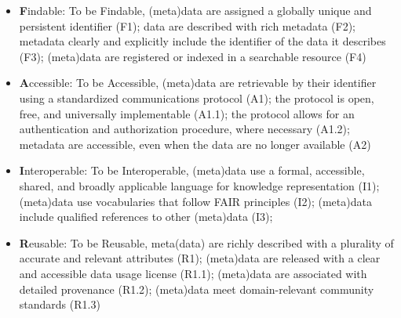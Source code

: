\begin{itemize}
	\item \textbf{F}indable: To be Findable, (meta)data  are assigned a globally unique and persistent identifier (F1); data are described with rich metadata (F2); metadata clearly and explicitly include the identifier of the data it describes (F3);  (meta)data are registered or indexed in a searchable resource (F4)
	\item \textbf{A}ccessible: To be Accessible, (meta)data are retrievable by their identifier using a standardized communications protocol (A1); the protocol is open, free, and universally implementable (A1.1); the protocol allows for an authentication and authorization procedure, where necessary (A1.2);  metadata are accessible, even when the data are no longer available (A2)
	\item \textbf{I}nteroperable:  To be Interoperable, (meta)data use a formal, accessible, shared, and broadly applicable language for knowledge representation (I1); (meta)data use vocabularies that follow FAIR principles (I2); (meta)data include qualified references to other (meta)data (I3);
	\item \textbf{R}eusable: To be Reusable, meta(data) are richly described with a plurality of accurate and relevant attributes (R1); (meta)data are released with a clear and accessible data usage license (R1.1); (meta)data are associated with detailed provenance (R1.2); (meta)data meet domain-relevant community standards (R1.3)
\end{itemize}

